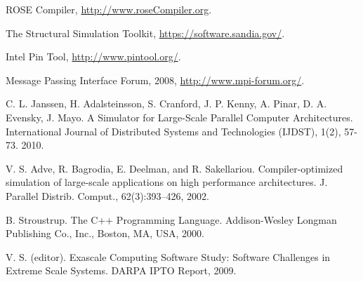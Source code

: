 \documentclass[preprint, cm, 10pt]{sigplanconf}
\begin{document}




\begin{thebibliography}{10}
\softraggedright

ROSE Compiler, \url {http://www.roseCompiler.org}.

The Structural Simulation Toolkit, \url {https://software.sandia.gov/}.

Intel Pin Tool, \url{http://www.pintool.org/}.

Message Passing Interface Forum, 2008, \url{http://www.mpi-forum.org/}.

 C. L. Janssen, H. Adalsteinsson, S. Cranford, J. P. Kenny, A. Pinar, D. A. Evensky, J. Mayo. A Simulator for Large-Scale Parallel Computer Architectures. International Journal of Distributed Systems and Technologies (IJDST), 1(2), 57-73. 2010.

 V. S. Adve, R. Bagrodia, E. Deelman, and R. Sakellariou. Compiler-optimized simulation of large-scale applications on high performance architectures. J. Parallel Distrib. Comput., 62(3):393–426, 2002.

B. Stroustrup. The C++ Programming Language. Addison-Wesley Longman Publishing Co., Inc., Boston, MA, USA, 2000.

V. S. (editor). Exascale Computing Software Study: Software Challenges in Extreme Scale Systems. DARPA IPTO Report, 2009.

\end{thebibliography}
\end{document}
